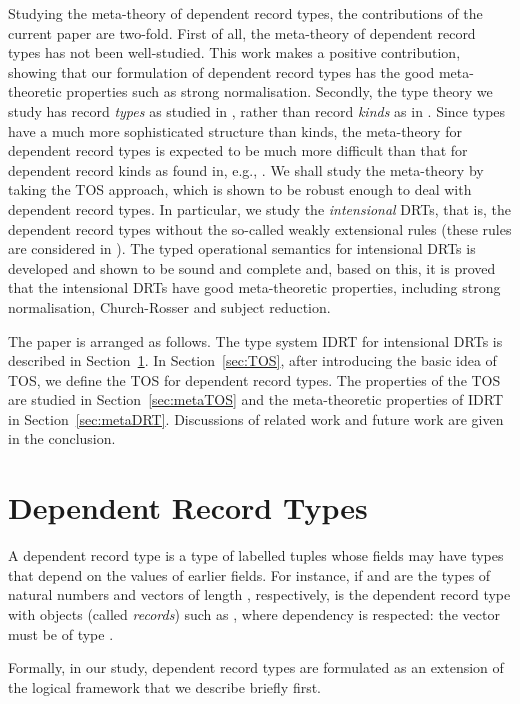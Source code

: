 \documentclass[submission,copyright,creativecommons]{eptcs}
\newcommand{\eg}{{e.g.}}
\begin{document}
Studying the meta-theory of dependent record types, the contributions of the current paper are two-fold.  First of all, the meta-theory of dependent record types has not been well-studied.  This work makes a positive contribution, showing that our formulation of dependent record types has the good meta-theoretic properties such as strong normalisation.  Secondly, the type theory we study has record \emph{types} as studied in \cite{Pollack:records02,luo:TYPES08}, rather than record \emph{kinds} as in \cite{bet-tar:subtyping98,ctp:semantic-records05}.  Since types have a much more sophisticated structure than kinds, the meta-theory for dependent record types is expected to be much more difficult than that for dependent record kinds as found in, \eg, \cite{ctp:semantic-records05}.  We shall study the meta-theory by taking the TOS approach, which is shown to be robust enough to deal with dependent record types.  In particular, we study the \emph{intensional} DRTs, that is, the dependent record types without the so-called weakly extensional rules (these rules are considered in \cite{luo:TYPES08}).  The typed operational semantics for intensional DRTs is developed and shown to be sound and complete and, based on this, it is proved that the intensional DRTs have good meta-theoretic properties, including strong normalisation, Church-Rosser and subject reduction.

The paper is arranged as follows. The type system IDRT for intensional DRTs is described in Section~\ref{sec:LFwithDRT}.  In Section~\ref{sec:TOS}, after introducing the basic idea of TOS, we define the TOS for dependent record types.  The properties of the TOS are studied in Section~\ref{sec:metaTOS} and the meta-theoretic properties of IDRT in Section~\ref{sec:metaDRT}.  Discussions of related work and future work are given in the conclusion.


\section{Dependent Record Types}
\label{sec:LFwithDRT}

A dependent record type is a type of labelled tuples whose fields may have types that depend on the values of earlier fields. For instance, if  and  are the types of natural numbers and vectors of length , respectively,  is the dependent record type with objects (called {\sl records}) such as , where dependency is respected: the vector  must be of type .

Formally, in our study, dependent record types are formulated as an extension of the logical framework that we describe briefly first.
\end{document}

